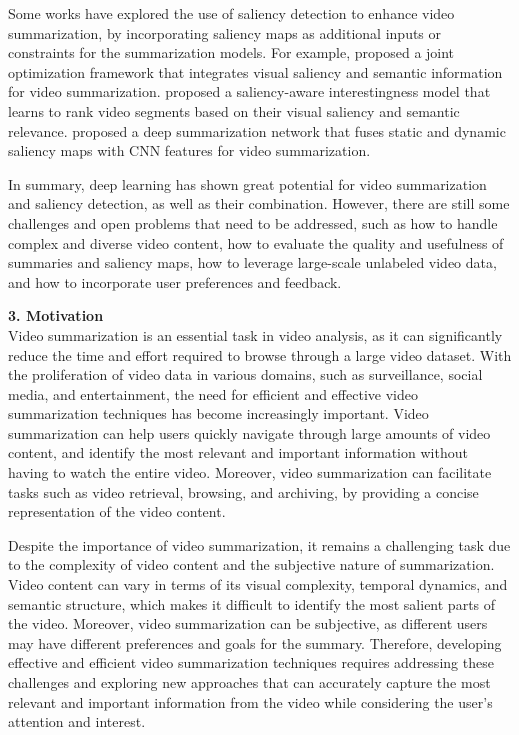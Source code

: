 \documentclass[14pt]{extarticle}
\begin{document}
    Some works have explored the use of saliency detection to enhance video summarization, by incorporating saliency maps as additional inputs or constraints for the summarization models. For example, \cite{ma2012video} proposed a joint optimization framework that integrates visual saliency and semantic information for video summarization. \cite{fu2014interestingness} proposed a saliency-aware interestingness model that learns to rank video segments based on their visual saliency and semantic relevance. \cite{liu2017video} proposed a deep summarization network that fuses static and dynamic saliency maps with CNN features for video summarization.
    
    In summary, deep learning has shown great potential for video summarization and saliency detection, as well as their combination. However, there are still some challenges and open problems that need to be addressed, such as how to handle complex and diverse video content, how to evaluate the quality and usefulness of summaries and saliency maps, how to leverage large-scale unlabeled video data, and how to incorporate user preferences and feedback.

    \vspace{.5cm}
    \textbf{3. Motivation} \\
    Video summarization is an essential task in video analysis, as it can significantly reduce the time and effort required to browse through a large video dataset. With the proliferation of video data in various domains, such as surveillance, social media, and entertainment, the need for efficient and effective video summarization techniques has become increasingly important. Video summarization can help users quickly navigate through large amounts of video content, and identify the most relevant and important information without having to watch the entire video. Moreover, video summarization can facilitate tasks such as video retrieval, browsing, and archiving, by providing a concise representation of the video content.

    Despite the importance of video summarization, it remains a challenging task due to the complexity of video content and the subjective nature of summarization. Video content can vary in terms of its visual complexity, temporal dynamics, and semantic structure, which makes it difficult to identify the most salient parts of the video. Moreover, video summarization can be subjective, as different users may have different preferences and goals for the summary. Therefore, developing effective and efficient video summarization techniques requires addressing these challenges and exploring new approaches that can accurately capture the most relevant and important information from the video while considering the user's attention and interest.
\end{document}

